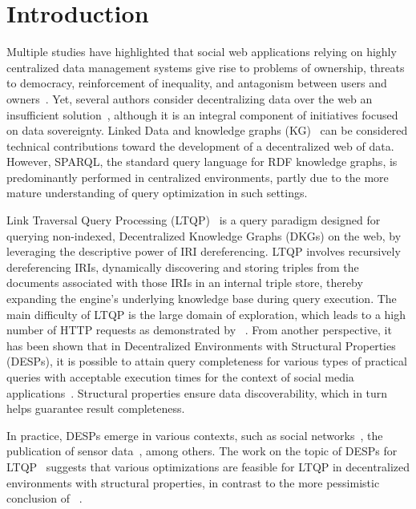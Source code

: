\section{Introduction}



Multiple studies have highlighted that social web applications relying on highly centralized data management systems give rise to problems of ownership, threats to democracy, reinforcement of inequality, and antagonism between users and owners~\cite{Terranova2000FreeLP, Curran2016ch1, Sevignani2013, 9663788}.
Yet, several authors consider decentralizing data over the web an insufficient solution~\cite{9663788, Curran2016ch1}, although it is an integral component of initiatives focused on data sovereignty.
Linked Data and knowledge graphs (KG)~\cite{heath2011} can be considered technical contributions toward the development of a decentralized web of data.
However, SPARQL, the standard query language for RDF knowledge graphs, is predominantly performed in centralized environments, partly due to the more mature understanding of query optimization in such settings.

Link Traversal Query Processing (LTQP)~\cite{Hartig2012} is a query paradigm designed for querying non-indexed, Decentralized Knowledge Graphs (DKGs) on the web, by leveraging the descriptive power of IRI dereferencing.
LTQP involves recursively dereferencing IRIs, dynamically discovering and storing triples from the documents associated with those IRIs in an internal triple store, thereby expanding the engine’s underlying knowledge base during query execution.
The main difficulty of LTQP is the large domain of exploration, which leads to a high number of HTTP requests as demonstrated by \citeauthor{hartig2016walking}~\cite{hartig2016walking}.
From another perspective, it has been shown that in Decentralized Environments with Structural Properties (DESPs), it is possible to attain query completeness for various types of practical queries with acceptable execution times for the context of social media applications~\cite{Taelman2023, nielsen1993response}.
Structural properties ensure data discoverability, which in turn helps guarantee result completeness.

In practice, DESPs emerge in various contexts, such as social networks~\cite{Taelman2023}, the publication of sensor data~\cite{tam_iswc_traversalsensortree_2024}, among others.
The work on the topic of DESPs for LTQP~\cite{Taelman2023, Bogaerts2021LinkTW} suggests that various optimizations are feasible for LTQP in decentralized environments with structural properties, in contrast to the more pessimistic conclusion of \citeauthor{hartig2016walking}~\cite{hartig2016walking}.

